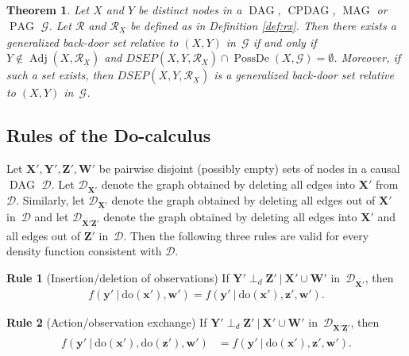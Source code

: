 \documentclass[11pt,a4paper]{article}
\newtheorem{theorem}[definition]{Theorem}
\newcommand{\ddo}{\textrm{do}}
\newcommand\given[1][]{\:#1\vert\:}
\newcommand{\dsepp}{\perp_{d}}
\DeclareMathOperator{\CPDAG}{CPDAG}
\DeclareMathOperator{\DAG}{DAG}
\DeclareMathOperator{\MAG}{MAG}
\DeclareMathOperator{\PAG}{PAG}
\DeclareMathOperator{\PossDe}{PossDe}
\DeclareMathOperator{\Adj}{Adj}
\newcommand{\g}[1][G]{\mathcal{#1}}
\newcommand{\dsep}[2][X,Y]{DSEP(#1,#2)}
\begin{document}
\begin{theorem} \citep[Theorem~4.1 in][]{maathuis2013generalized}
Let $X$ and $Y$ be distinct nodes in a $\DAG$, $\CPDAG$, $\MAG$ or $\PAG$ $\g$. Let $\g[R]$ and $\g[R]_{\underline{X}}$ be defined as in Definition
\ref{def:rx}. Then there exists a generalized back-door set relative to $(X,Y)$ in~$\g$ if and only if $Y \notin \Adj(X,\g[R]_{\underline{X}})$ and $
\dsep{\g[R]_{\underline{X}}} \cap \PossDe(X,\g) = \emptyset$. Moreover, if such a set exists, then $\dsep{\g[R]_{\underline{X}}}$ is a generalized back-door set
relative to $(X,Y)$ in~$\g$.
\label{theorem:marloes constructive gbc}
\end{theorem}


\subsection{Rules of the Do-calculus \citep[][Chapter~3.4]{Pearl2009}}

Let $\mathbf{X',Y',Z',W'}$ be pairwise disjoint (possibly empty) sets of nodes in a causal $\DAG$ $\g[D]$.
Let $\g[D]_{\overline{\mathbf{X'}}}$ denote the graph obtained by deleting all edges into $\mathbf{X'}$ from $\g[D]$. Similarly, let $\g[D]_{\underline{\mathbf{X'}}}$ denote the graph obtained by deleting all edges out of $\mathbf{X'}$ in~$\g[D]$ and let $\g[D]_{\overline{\mathbf{X'}}\underline{\mathbf{Z'}}}$ denote the graph obtained by deleting all edges into $\mathbf{X'}$ and all edges out of $\mathbf{Z'}$ in~$\g[D]$.
Then the following three rules are valid for every density function consistent with $\g[D]$.

\textbf{Rule 1} (Insertion/deletion of observations) If $\mathbf{Y'} \dsepp \mathbf{Z'} \given \mathbf{X'} \cup \mathbf{W'}$ in~$\g[D]_{\overline{\mathbf{X'}}}$, then
\begin{align}
f(\mathbf{y'} \given \ddo(\mathbf{x'}),\mathbf{w'}) = f(\mathbf{y'} \given \ddo(\mathbf{x'}),\mathbf{z',w'}). \label{rule1}
\end{align}

\textbf{Rule 2} (Action/observation exchange) If $\mathbf{Y'} \dsepp \mathbf{Z'} \given \mathbf{X'} \cup \mathbf{W'}$ in~$\g[D]_{\overline{\mathbf{X'}}\underline{\mathbf{Z'}}}$, then
\begin{align} \label{rule2}
\begin{split}
f(\mathbf{y'} \given \ddo(\mathbf{x'}),\ddo(\mathbf{z'}),\mathbf{w'}) & = f(\mathbf{y'} \given \ddo(\mathbf{x'}),\mathbf{z',w'}).
\end{split}
\end{align}
\end{document}
